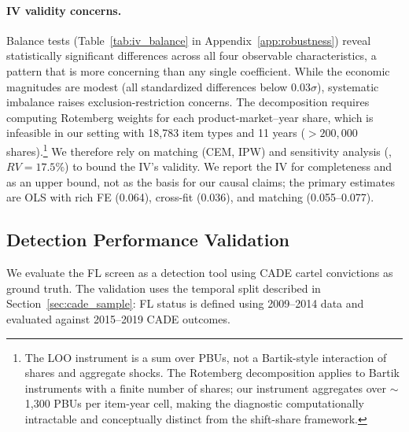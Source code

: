 \paragraph{IV validity concerns.} %
Balance tests (Table~\ref{tab:iv_balance} in
Appendix~\ref{app:robustness}) reveal statistically significant
differences across all four observable characteristics, a pattern that
is more concerning than any single coefficient. While the economic
magnitudes are modest (all standardized differences below
$0.03\sigma$), systematic imbalance raises exclusion-restriction
concerns. The \citet{goldsmithpinkham2020bartik} decomposition
requires computing Rotemberg weights for each product-market--year
share, which is infeasible in our setting with 18,783 item types and
11 years ($> 200{,}000$ shares).\footnote{The LOO instrument is a
sum over PBUs, not a Bartik-style interaction of shares and aggregate
shocks. The Rotemberg decomposition applies to Bartik instruments
with a finite number of shares; our instrument aggregates over
$\sim$1,300 PBUs per item-year cell, making the diagnostic
computationally intractable and conceptually distinct from the
shift-share framework.} We therefore rely on matching (CEM, IPW) and
sensitivity analysis (\citealt{cinelli2020making}, $RV = 17.5\%$) to
bound the IV's validity. We report the IV for completeness and as an
upper bound, not as the basis for our causal claims; the primary
estimates are OLS with rich FE (0.064), cross-fit (0.036), and
matching (0.055--0.077).


\subsection{Detection Performance Validation}
\label{sec:detection_validation}

We evaluate the FL screen as a detection tool using CADE cartel
convictions as ground truth. The validation uses the temporal split
described in Section~\ref{sec:cade_sample}: FL status is defined using
2009--2014 data and evaluated against 2015--2019 CADE outcomes.

